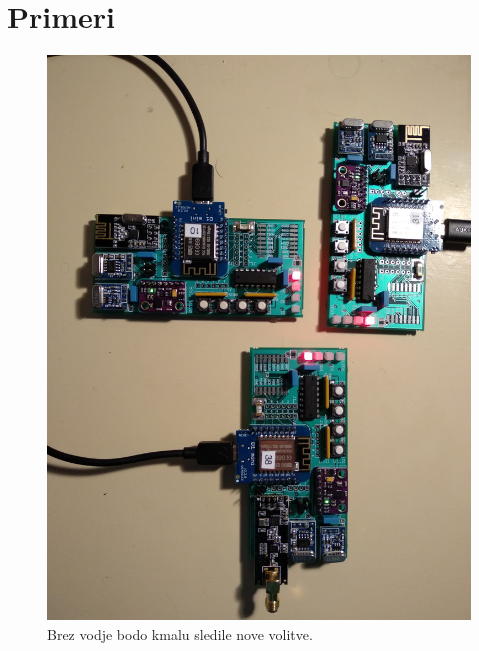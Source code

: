 \documentclass[runningheads]{llncs}
\begin{document}
\section{Primeri}
\begin{figure}
  \includegraphics[width=\linewidth]{no_leader.jpg}
  \caption{Brez vodje bodo kmalu sledile nove volitve.}
  \label{fig:no_leader}
\end{figure}
\end{document}
